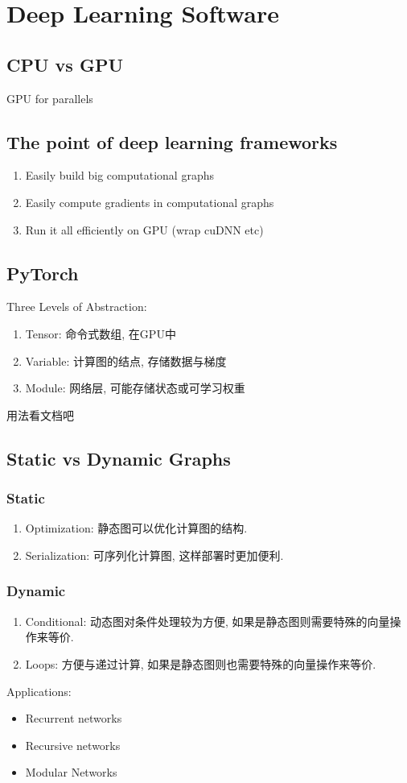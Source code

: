 \newpage
\section{Deep Learning Software}
\subsection{CPU vs GPU}
GPU for parallels

\subsection{The point of deep learning frameworks}
\begin{enumerate}
    \item Easily build big computational graphs
    \item Easily compute gradients in computational graphs
    \item Run it all efficiently on GPU (wrap cuDNN etc)
\end{enumerate}

\subsection{PyTorch}
Three Levels of Abstraction:
\begin{enumerate}
    \item Tensor: 命令式数组, 在GPU中
    \item Variable: 计算图的结点, 存储数据与梯度
    \item Module: 网络层, 可能存储状态或可学习权重
\end{enumerate}

用法看文档吧

\subsection{Static vs Dynamic Graphs}

\subsubsection{Static}
\begin{enumerate}
    \item Optimization: 静态图可以优化计算图的结构.
    \item Serialization: 可序列化计算图, 这样部署时更加便利. 
\end{enumerate}

\subsubsection{Dynamic}
\begin{enumerate}
    \item Conditional: 动态图对条件处理较为方便, 如果是静态图则需要特殊的向量操作来等价. 
    \item Loops: 方便与递过计算, 如果是静态图则也需要特殊的向量操作来等价. 
\end{enumerate}

Applications:
\begin{itemize}
    \item Recurrent networks
    \item Recursive networks
    \item Modular Networks
\end{itemize}